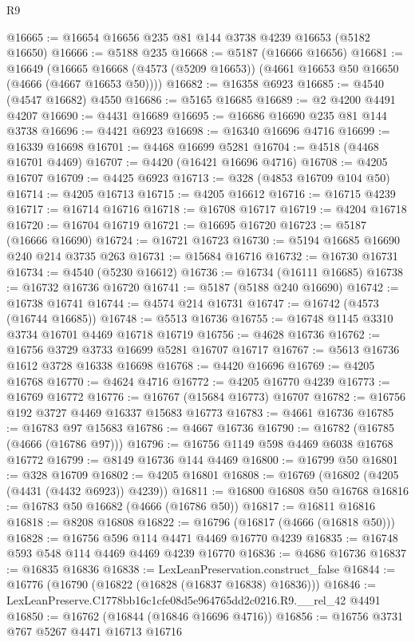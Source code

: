 \begin{lexlean}{R9}
\begin{coremodule}
@16665 := @16654 @16656 @235 @81 @144 @3738 @4239 @16653 (@5182 @16650)
@16666 := @5188 @235
@16668 := @5187 (@16666 @16656)
@16681 := @16649
    (@16665 @16668 (@4573 (@5209 @16653)) (@4661 @16653 @50 @16650 (@4666 (@4667 @16653 @50))))
@16682 := @16358 @6923
@16685 := @4540 (@4547 @16682) @4550
@16686 := @5165 @16685
@16689 := @2 @4200 @4491 @4207
@16690 := @4431 @16689
@16695 := @16686 @16690 @235 @81 @144 @3738
@16696 := @4421 @6923
@16698 := @16340 @16696 @4716
@16699 := @16339 @16698
@16701 := @4468 @16699 @5281
@16704 := @4518 (@4468 @16701 @4469)
@16707 := @4420 (@16421 @16696 @4716)
@16708 := @4205 @16707
@16709 := @4425 @6923
@16713 := @328 (@4853 @16709 @104 @50)
@16714 := @4205 @16713
@16715 := @4205 @16612
@16716 := @16715 @4239
@16717 := @16714 @16716
@16718 := @16708 @16717
@16719 := @4204 @16718
@16720 := @16704 @16719
@16721 := @16695 @16720
@16723 := @5187 (@16666 @16690)
@16724 := @16721 @16723
@16730 := @5194 @16685 @16690 @240 @214 @3735 @263
@16731 := @15684 @16716
@16732 := @16730 @16731
@16734 := @4540 (@5230 @16612)
@16736 := @16734 (@16111 @16685)
@16738 := @16732 @16736 @16720
@16741 := @5187 (@5188 @240 @16690)
@16742 := @16738 @16741
@16744 := @4574 @214 @16731
@16747 := @16742 (@4573 (@16744 @16685))
@16748 := @5513 @16736
@16755 := @16748 @1145 @3310 @3734 @16701 @4469 @16718 @16719
@16756 := @4628 @16736
@16762 := @16756 @3729 @3733 @16699 @5281 @16707 @16717
@16767 := @5613 @16736 @1612 @3728 @16338 @16698
@16768 := @4420 @16696
@16769 := @4205 @16768
@16770 := @4624 @4716
@16772 := @4205 @16770 @4239
@16773 := @16769 @16772
@16776 := @16767 (@15684 @16773) @16707
@16782 := @16756 @192 @3727 @4469 @16337 @15683 @16773
@16783 := @4661 @16736
@16785 := @16783 @97 @15683
@16786 := @4667 @16736
@16790 := @16782 (@16785 (@4666 (@16786 @97)))
@16796 := @16756 @1149 @598 @4469 @6038 @16768 @16772
@16799 := @8149 @16736 @144 @4469
@16800 := @16799 @50
@16801 := @328 @16709
@16802 := @4205 @16801
@16808 := @16769 (@16802 (@4205 (@4431 (@4432 @6923)) @4239))
@16811 := @16800 @16808 @50 @16768
@16816 := @16783 @50 @16682 (@4666 (@16786 @50))
@16817 := @16811 @16816
@16818 := @8208 @16808
@16822 := @16796 (@16817 (@4666 (@16818 @50)))
@16828 := @16756 @596 @114 @4471 @4469 @16770 @4239
@16835 := @16748 @593 @548 @114 @4469 @4469 @4239 @16770
@16836 := @4686 @16736
@16837 := @16835 @16836
@16838 := LexLeanPreservation.construct_false
@16844 := @16776 (@16790 (@16822 (@16828 (@16837 @16838) @16836)))
@16846 := LexLeanPreserve.C1778bb16c1cfe08d5e964765dd2c0216.R9.__rel_42 @4491
@16850 := @16762 (@16844 (@16846 @16696 @4716))
@16856 := @16756 @3731 @767 @5267 @4471 @16713 @16716

\end{coremodule}
\end{lexlean}
